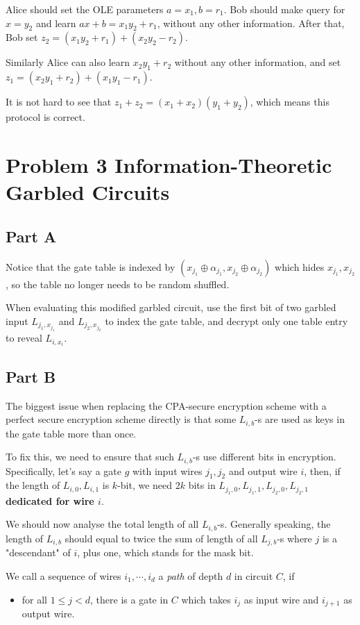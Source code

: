 \documentclass[8pt]{article}
\theoremstyle{compact}
\def\le{\leqslant}
\begin{document}
Alice should set the OLE parameters $a = x_1, b = r_1$. Bob should make query for $x = y_2$ and learn $ax + b = x_1y_2 + r_1$, without any other information. After that, Bob set $z_2 = (x_1y_2 + r_1) + (x_2y_2 - r_2)$.

Similarly Alice can also learn $x_2y_1 + r_2$ without any other information, and set $z_1 = (x_2y_1 + r_2) + (x_1y_1 - r_1)$.

It is not hard to see that $z_1 + z_2 = (x_1 + x_2)(y_1 + y_2)$, which means this protocol is correct.

\newpage
\section*{Problem 3 Information-Theoretic Garbled Circuits}
\subsection*{Part A}
Notice that the gate table is indexed by $(x_{j_1} \oplus \alpha_{j_1}, x_{j_2} \oplus \alpha_{j_2})$ which hides $x_{j_1}, x_{j_2}$, so the table no longer needs to be random shuffled.

When evaluating this modified garbled circuit, use the first bit of two garbled input $L_{j_1, x_{j_1}}$ and $L_{j_2, x_{j_2}}$ to index the gate table, and decrypt only one table entry to reveal $L_{i, x_i}$.
\subsection*{Part B}

The biggest issue when replacing the CPA-secure encryption scheme with a perfect secure encryption scheme directly is that some $L_{i, b}$-s are used as keys in the gate table more than once.

To fix this, we need to ensure that such $L_{i, b}$-s use different bits in encryption. Specifically, let's say a gate $g$ with input wires $j_1, j_2$ and output wire $i$, then, if the length of $L_{i, 0}, L_{i, 1}$ is $k$-bit, we need $2k$ bits in $L_{j_1, 0}, L_{j_1, 1}, L_{j_2, 0}, L_{j_2, 1}$ \textbf{dedicated for wire $i$}.

We should now analyse the total length of all $L_{i, b}$-s. Generally speaking, the length of $L_{i, b}$ should equal to twice the sum of length of all $L_{j, b}$-s where $j$ is a "descendant" of $i$, plus one, which stands for the mask bit.

We call a sequence of wires $i_1, \cdots, i_d$ a \textit{path} of depth $d$ in circuit $C$, if \begin{itemize}
	\item for all $1 \le j < d$, there is a gate in $C$ which takes $i_{j}$ as input wire and $i_{j+1}$ as output wire.
\end{itemize}
\end{document}

